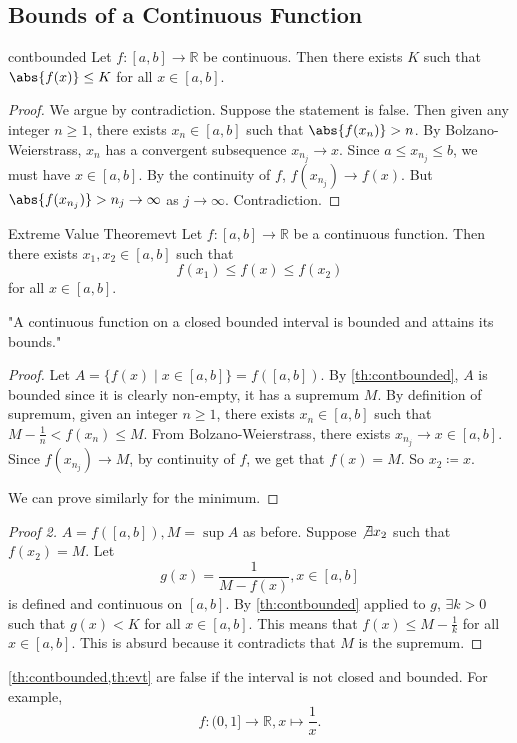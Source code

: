 \subsection{Bounds of a Continuous Function}
\leavevmode
\begin{theorem}{}{contbounded}
    Let \(f:[a,b] \to \mathbb{R}\) be continuous. Then there exists \(K\) such that \(\abs{f(x)} \leq K\) for all \(x \in [a,b]\).
\end{theorem}
\begin{proof}
    We argue by contradiction. Suppose the statement is false. Then given any integer \(n \geq 1\), there exists \(x_n \in [a,b]\) such that \(\abs{f(x_n)}  > n\). By Bolzano-Weierstrass, \(x_n\) has a convergent subsequence \(x_{n_j} \to x\). Since \(a \leq x_{n_j} \leq b\), we must have \(x \in [a,b]\). By the continuity of \(f\), \(f(x_{n_j}) \to f(x)\). But \(\abs{f(x_{n_j})} > n_j \to \infty\) as \(j\to \infty\). Contradiction.
\end{proof}
\begin{theorem}{Extreme Value Theorem}{evt}
    Let \(f:[a,b] \to \mathbb{R}\) be a continuous function. Then there exists \(x_1, x_2 \in [a,b]\) such that
    \[
        f(x_1) \leq f(x) \leq f(x_2)
    \]
    for all \(x \in [a,b]\).
    
    "A continuous function on a closed bounded interval is bounded and attains its bounds."
\end{theorem}
\begin{proof}
    Let \(A = \{f(x)\mid x \in [a,b]\} = f([a,b])\). By \cref{th:contbounded}, \(A\) is bounded since it is clearly non-empty, it has a supremum \(M\). By definition of supremum, given an integer \(n\geq 1\), there exists \(x_n \in [a,b]\) such that \(M-\frac{1}{n}<f(x_n) \leq M\). From Bolzano-Weierstrass, there exists \(x_{n_j} \to x \in [a,b]\). Since \(f(x_{n_j}) \to M\), by continuity of \(f\), we get that \(f(x) = M\). So \(x_2\coloneqq x\).

    We can prove similarly for the minimum.
\end{proof}
\begin{proof}[Proof 2]
    \(A = f([a,b]), M = \sup A\) as before. Suppose \(\not\exists x_2\) such that \(f(x_2) = M\). Let
    \[g(x) = \frac{1}{M - f(x)}, x \in [a,b]\]
    is defined and continuous on \([a,b]\). By \cref{th:contbounded} applied to \(g\), \(\exists k >0\) such that \(g(x) < K\) for all \(x \in [a,b]\). This means that \(f(x) \leq M - \frac{1}{k}\) for all \(x \in [a,b]\). This is absurd because it contradicts that \(M\) is the supremum.
\end{proof}
\begin{note}
    \cref{th:contbounded,th:evt} are false if the interval is not closed and bounded. For example,
    \[
        f: (0,1] \to \mathbb{R}, x \mapsto \frac{1}{x}.
    \]
\end{note}
